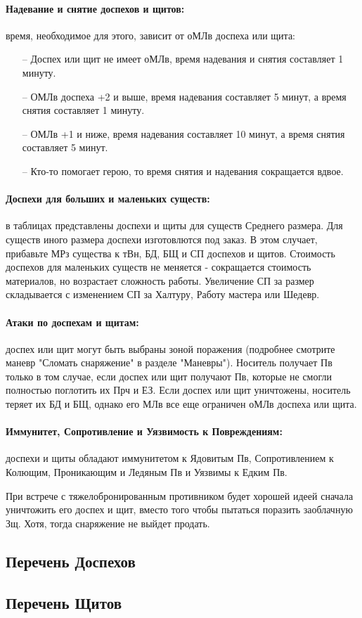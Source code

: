 \paragraph{Надевание и снятие доспехов и щитов:} время, необходимое для этого, зависит от оМЛв доспеха или щита:
\begin{itemize}
    \item[--] Доспех или щит не имеет оМЛв, время надевания и снятия составляет 1 минуту.
    \item[--] ОМЛв доспеха +2 и выше, время надевания составляет 5 минут, а время снятия составляет 1 минуту.
    \item[--] ОМЛв +1 и ниже, время надевания составляет 10 минут, а время снятия составляет 5 минут.
    \item[--] Кто-то помогает герою, то время снятия и надевания сокращается вдвое.
\end{itemize}
\paragraph{Доспехи для больших и маленьких существ:} в таблицах представлены доспехи и щиты для существ Среднего размера. Для существ иного размера доспехи изготовлются под заказ. 
\newline В этом случает, прибавьте МРз существа к тВн, БД, БЩ и СП доспехов и щитов. Стоимость доспехов для маленьких существ не меняется - сокращается стоимость материалов, но возрастает сложность работы. Увеличение СП за размер складывается с изменением СП за Халтуру, Работу мастера или Шедевр.
\paragraph{Атаки по доспехам и щитам:} доспех или щит могут быть выбраны зоной поражения (подробнее смотрите маневр "Сломать снаряжение" в разделе "Маневры"). Носитель получает Пв только в том случае, если доспех или щит получают Пв, которые не смогли полностью поглотить их Прч и ЕЗ.
\newline Если доспех или щит уничтожены, носитель теряет их БД и БЩ, однако его МЛв все еще ограничен оМЛв доспеха или щита.
\paragraph{Иммунитет, Сопротивление и Уязвимость к Повреждениям:} доспехи и щиты обладают иммунитетом к Ядовитым Пв, Сопротивлением к Колющим, Проникающим и Ледяным Пв и Уязвимы к Едким Пв. 
\begin{tcolorbox}
    При встрече с тяжелобронированным противником будет хорошей идеей сначала уничтожить его доспех и щит, вместо того чтобы пытаться поразить заоблачную Зщ. Хотя, тогда снаряжение не выйдет продать. 
\end{tcolorbox}

\subsection{Перечень Доспехов}

\subsection{Перечень Щитов}


